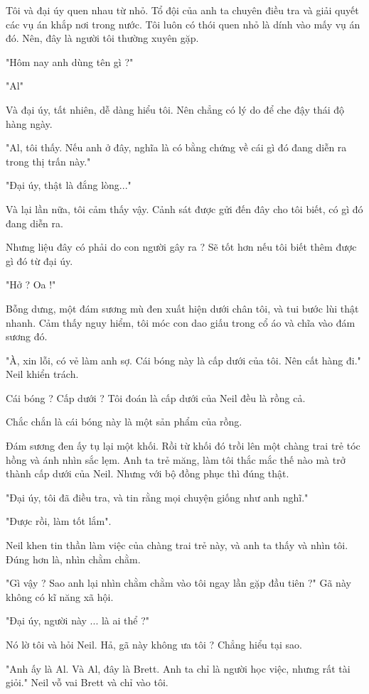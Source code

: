 Tôi và đại úy quen nhau từ nhỏ. Tổ đội của anh ta chuyên điều tra và giải quyết các vụ án khắp nơi trong nước. Tôi luôn có thói quen nhỏ là dính vào mấy vụ án đó. Nên, đây là người tôi thường xuyên gặp.

"Hôm nay anh dùng tên gì ?"

"Al"

Và đại úy, tất nhiên, dễ dàng hiểu tôi. Nên chẳng có lý do để che đậy thái độ hàng ngày.

"Al, tôi thấy. Nếu anh ở đây, nghĩa là có bằng chứng về cái gì đó đang diễn ra trong thị trấn này."

"Đại úy, thật là đắng lòng..."

Và lại lần nữa, tôi cảm thấy vậy. Cảnh sát được gửi đến đây cho tôi biết, có gì đó đang diễn ra.

Nhưng liệu đây có phải do con người gây ra ? Sẽ tốt hơn nếu tôi biết thêm được gì đó từ đại úy.

"Hở ? Oa !"

Bỗng dưng, một đám sương mù đen xuất hiện dưới chân tôi, và tui bước lùi thật nhanh. Cảm thấy nguy hiểm, tôi móc con dao giấu trong cổ áo và chĩa vào đám sương đó.

"À, xin lỗi, có vẻ làm anh sợ. Cái bóng này là cấp dưới của tôi. Nên cất hàng đi." Neil khiển trách.

Cái bóng ? Cấp dưới ? Tôi đoán là cấp dưới của Neil đều là rồng cả.

Chắc chắn là cái bóng này là một sản phẩm của rồng. 

Đám sương đen ấy tụ lại một khối. Rồi từ khối đó trồi lên một chàng trai trẻ tóc hồng và ánh nhìn sắc lẹm. Anh ta trẻ măng, làm tôi thắc mắc thế nào mà trở thành cấp dưới của Neil. Nhưng với bộ đồng phục thì đúng thật.

"Đại úy, tôi đã điều tra, và tin rằng mọi chuyện giống như anh nghĩ."

"Được rồi, làm tốt lắm".

Neil khen tin thần làm việc của chàng trai trẻ này, và anh ta thấy và nhìn tôi. Đúng hơn là, nhìn chằm chằm.

"Gì vậy ? Sao anh lại nhìn chằm chằm vào tôi ngay lần gặp đầu tiên ?" Gã này không có kĩ năng xã hội.

"Đại úy, người này ... là ai thể ?"

Nó lờ tôi và hỏi Neil. Hả, gã này không ưa tôi ? Chẳng hiểu tại sao.

"Anh ấy là Al. Và Al, đây là Brett. Anh ta chỉ là người học việc, nhưng rất tài giỏi." Neil vỗ vai Brett và chỉ vào tôi.

